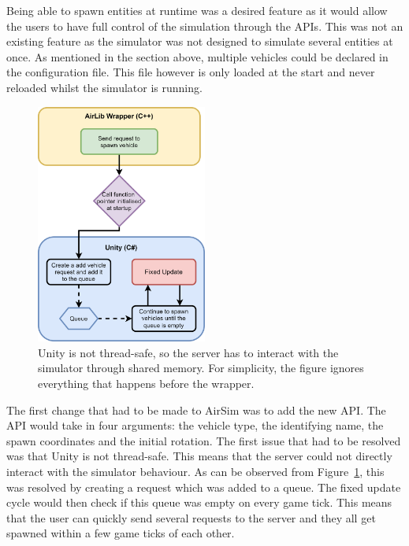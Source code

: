

Being able to spawn entities at runtime was a desired feature as it would allow the users to have full control of the simulation through the APIs. This was not an existing feature as the simulator was not designed to simulate several entities at once. As mentioned in the section above, multiple vehicles could be declared in the configuration file. This file however is only loaded at the start and never reloaded whilst the simulator is running. 

\begin{figure}
    \includegraphics[width=0.5\textwidth]{06_Implementation/00_AirSim/Diagrams/spawnVehicle.png}
    \caption[SpawnVehicle API]{Unity is not thread-safe, so the server has to interact with the simulator through shared memory. For simplicity, the figure ignores everything that happens before the wrapper.} \label{06:spawnVehicle}
\end{figure}

The first change that had to be made to AirSim was to add the new API. The API would take in four arguments: the vehicle type, the identifying name, the spawn coordinates and the initial rotation. The first issue that had to be resolved was that Unity is not thread-safe. This means that the server could not directly interact with the simulator behaviour. As can be observed from Figure~\ref{06:spawnVehicle}, this was resolved by creating a request which was added to a queue. The fixed update cycle would then check if this queue was empty on every game tick. This means that the user can quickly send several requests to the server and they all get spawned within a few game ticks of each other. 

